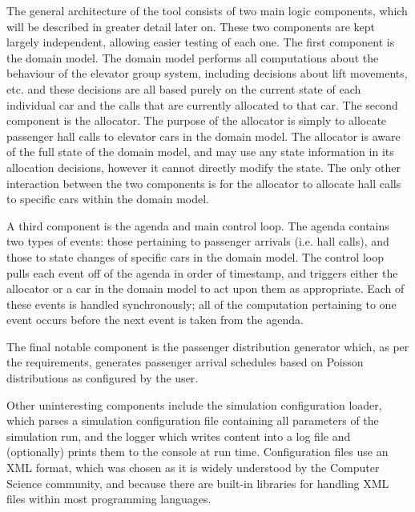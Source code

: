 \documentclass{UoYCSproject}
\begin{document}
The general architecture of the tool consists of two main logic components, which will be described in greater detail later on.  These two components are kept largely independent, allowing easier testing of each one.  The first component is the domain model.  The domain model performs all computations about the behaviour of the elevator group system, including decisions about lift movements, etc. and these decisions are all based purely on the current state of each individual car and the calls that are currently allocated to that car.  The second component is the allocator.  The purpose of the allocator is simply to allocate passenger hall calls to elevator cars in the domain model.  The allocator is aware of the full state of the domain model, and may use any state information in its allocation decisions, however it cannot directly modify the state.  The only other interaction between the two components is for the allocator to allocate hall calls to specific cars within the domain model.

A third component is the agenda and main control loop.  The agenda contains two types of events: those pertaining to passenger arrivals (i.e. hall calls), and those to state changes of specific cars in the domain model.  The control loop pulls each event off of the agenda in order of timestamp, and triggers either the allocator or a car in the domain model to act upon them as appropriate.  Each of these events is handled synchronously; all of the computation pertaining to one event occurs before the next event is taken from the agenda.

The final notable component is the passenger distribution generator which, as per the requirements, generates passenger arrival schedules based on Poisson distributions as configured by the user.

Other uninteresting components include the simulation configuration loader, which parses a simulation configuration file containing all parameters of the simulation run, and the logger which writes content into a log file and (optionally) prints them to the console at run time.  Configuration files use an XML format, which was chosen as it is widely understood by the Computer Science community, and because there are built-in libraries for handling XML files within most programming languages.
\end{document}
